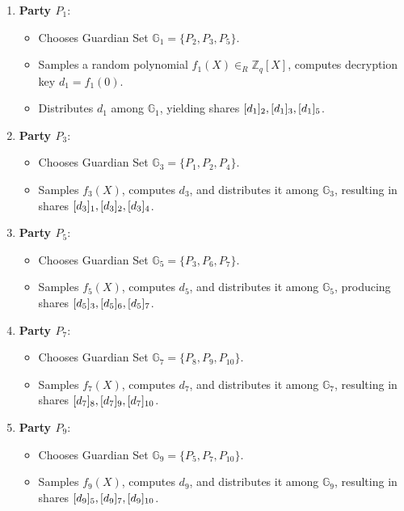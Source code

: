 \documentclass[runningheads]{llncs}
\begin{document}
\begin{enumerate}
    \item \textbf{Party $P_1$}:
        \begin{itemize}
            \item Chooses Guardian Set $\mathbb{G}_1 = \{P_2, P_3, P_5\}$.
            \item Samples a random polynomial $f_1(X) \in_R \mathbb{Z}_q[X]$, computes decryption key $d_1 = f_1(0)$.
            \item Distributes $d_1$ among $\mathbb{G}_1$, yielding shares $[d_{1}]_{2}, [d_{1}]_{3}, [d_{1}]_{5}$.
        \end{itemize}

    \item \textbf{Party $P_3$}:
        \begin{itemize}
            \item Chooses Guardian Set $\mathbb{G}_3 = \{P_1, P_2, P_4\}$.
            \item Samples $f_3(X)$, computes $d_3$, and distributes it among $\mathbb{G}_3$, resulting in shares $[d_{3}]_{1}, [d_{3}]_{2}, [d_{3}]_{4}$.
        \end{itemize}

    \item \textbf{Party $P_5$}:
        \begin{itemize}
            \item Chooses Guardian Set $\mathbb{G}_5 = \{P_3, P_6, P_7\}$.
            \item Samples $f_5(X)$, computes $d_5$, and distributes it among $\mathbb{G}_5$, producing shares $[d_{5}]_{3}, [d_{5}]_{6}, [d_{5}]_{7}$.
        \end{itemize}

    \item \textbf{Party $P_7$}:
        \begin{itemize}
            \item Chooses Guardian Set $\mathbb{G}_7 = \{P_8, P_9, P_{10}\}$.
            \item Samples $f_7(X)$, computes $d_7$, and distributes it among $\mathbb{G}_7$, resulting in shares $[d_{7}]_{8}, [d_{7}]_{9}, [d_{7}]_{10}$.
        \end{itemize}

    \item \textbf{Party $P_9$}:
        \begin{itemize}
            \item Chooses Guardian Set $\mathbb{G}_9 = \{P_5, P_7, P_{10}\}$.
            \item Samples $f_9(X)$, computes $d_9$, and distributes it among $\mathbb{G}_9$, resulting in shares $[d_{9}]_{5}, [d_{9}]_{7}, [d_{9}]_{10}$.
        \end{itemize}
\end{enumerate}
\end{document}
